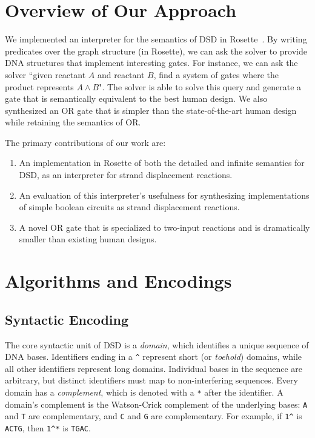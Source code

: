 \documentclass{article}[10pt]
\begin{document}
\section{Overview of Our Approach}

We implemented an interpreter for the semantics of
DSD in Rosette~\cite{rosette}. By writing predicates
over the graph structure (in Rosette), we can ask
the solver to provide DNA structures that implement
interesting gates. For instance, we can ask the solver ``given
reactant $A$ and reactant $B$, find a system of gates where the
product represents $A \land B$". The solver is able to solve this
query and generate a gate that is semantically equivalent to
the best human design. We also synthesized an OR gate that
is simpler than the state-of-the-art human design while
retaining the semantics of OR.

The primary contributions of our work are:
\begin{enumerate}
\item
  An implementation in Rosette of both the detailed
  and infinite semantics for DSD, as an interpreter for
  strand displacement reactions.

\item
  An evaluation of this interpreter's usefulness for synthesizing
  implementations of simple boolean circuits as strand displacement
  reactions.

\item
  A novel OR gate that is specialized to two-input reactions and
  is dramatically smaller than existing human designs.
\end{enumerate}

\section{Algorithms and Encodings}

\subsection{Syntactic Encoding}

The core syntactic unit of DSD is a \emph{domain}, which identifies
a unique sequence of DNA bases.  Identifiers ending
in a \lstinline{^} represent short (or \emph{toehold}) domains,
while all other identifiers represent long domains.
Individual bases in the sequence are arbitrary, but distinct identifiers must
map to non-interfering sequences.
Every domain has a \emph{complement}, which is denoted
with a \lstinline{*} after the identifier. A domain's complement is
the Watson-Crick complement of the underlying bases: \lstinline{A} and \lstinline{T}
are complementary, and \lstinline{C} and \lstinline{G} are complementary.  
For example, if \lstinline{1^} is \lstinline{ACTG}, then \lstinline{1^*}
is \lstinline{TGAC}.
\end{document}
